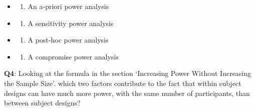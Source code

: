 \documentclass[
  letterpaper,
  DIV=11,
  numbers=noendperiod]{scrreprt}
\providecommand{\tightlist}{%
  \setlength{\itemsep}{0pt}\setlength{\parskip}{0pt}}\usepackage{longtable,booktabs,array}
\begin{document}
\begin{itemize}
\item
  \begin{enumerate}
  \def\labelenumi{(\Alph{enumi})}
  \tightlist
  \item
    An a-priori power analysis\\
  \end{enumerate}
\item
  \begin{enumerate}
  \def\labelenumi{(\Alph{enumi})}
  \setcounter{enumi}{1}
  \tightlist
  \item
    A sensitivity power analysis\\
  \end{enumerate}
\item
  \begin{enumerate}
  \def\labelenumi{(\Alph{enumi})}
  \setcounter{enumi}{2}
  \tightlist
  \item
    A post-hoc power analysis\\
  \end{enumerate}
\item
  \begin{enumerate}
  \def\labelenumi{(\Alph{enumi})}
  \setcounter{enumi}{3}
  \tightlist
  \item
    A compromise power analysis\\
  \end{enumerate}
\end{itemize}

\textbf{Q4}: Looking at the formula in the section `Increasing Power
Without Increasing the Sample Size'. which two factors contribute to the
fact that within subject designs can have much more power, with the same
number of participants, than between subject designs?
\end{document}

